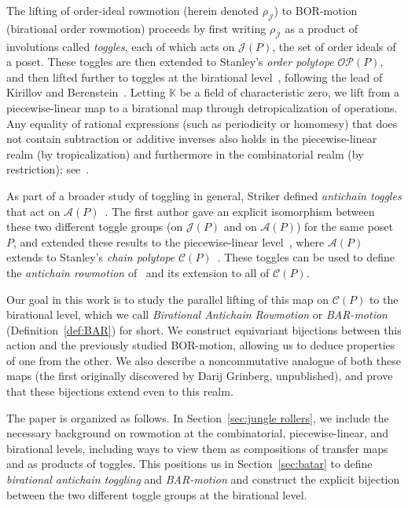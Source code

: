 \documentclass[ALCO,ThmDefs,Unicode,epreuves]{cedram}
\newcommand{\kk}{\mathbb{K}}
\newcommand{\cala}{\mathcal{A}}
\newcommand{\calc}{\mathcal{C}}
\newcommand{\calj}{\mathcal{J}}
\newcommand{\calo}{\mathcal{O}}
\newcommand{\calp}{\mathcal{P}}
\newcommand\rowm{\rho}
\newcommand\rowJ{\rowm_{\mathcal{J}}}
\begin{document}
The lifting of order-ideal rowmotion (herein denoted $\rowJ$) to BOR-motion (birational order rowmotion) proceeds by first writing $\rowJ$ as a product of
involutions called \textit{toggles}, each of which acts on $\calj(P)$, the set of order ideals of a
poset. These toggles are then extended to Stanley's \textit{order polytope} $\calo\calp(P)$,
and then lifted further to toggles at
the birational level~\cite{einpropp}, following the lead of Kirillov and Berenstein~\cite{berenstein}.
Letting $\kk$ be a field of characteristic zero, we lift from a piecewise-linear map to a birational map through detropicalization of operations.
Any equality of rational expressions (such as periodicity or
homomesy) that does not contain subtraction or
additive inverses 
also holds in the piecewise-linear realm (by tropicalization) and furthermore in the
combinatorial realm (by restriction); see~\cite[Remark~10]{GrRo16}.

As part of a broader study of toggling in general, Striker defined \emph{antichain toggles}
that act on $\cala (P)$~\cite{strikergentog}. The first
author gave an explicit isomorphism between these two different toggle groups (on $\calj (P)$
and on $\cala(P)$) for the same
poset $P$, and extended these results to the piecewise-linear level~\cite{antichain-toggling}, 
where $\cala (P)$
extends to Stanley's \emph{chain polytope} $\calc (P)$~\cite{Sta86}. These toggles can be
used to define the \emph{antichain rowmotion} of~\cite{brouwer1974period} and its extension
to all of $\calc (P)$.

Our goal in this work is to study the parallel lifting of this map on $\calc (P)$ to the
birational level, which we call \emph{Birational Antichain Rowmotion} or \emph{BAR-motion}
(Definition~\ref{def:BAR}) for short. We construct equivariant bijections between this
action and the previously studied BOR-motion, allowing us to deduce properties of one from
the other. We also describe a noncommutative analogue of both these maps (the first
originally discovered by Darij Grinberg, unpublished), and prove that these bijections
extend even to this realm.

The paper is organized as follows. In Section~\ref{sec:jungle rollers}, we include the
necessary background on rowmotion at the combinatorial, piecewise-linear, and birational
levels, including ways to view them as compositions of transfer maps and as products of
toggles. This positions us in Section~\ref{sec:batar} to define \textit{birational
antichain toggling} and \textit{BAR-motion} and construct the explicit bijection between the
two different toggle groups at the birational level. 
\end{document}

